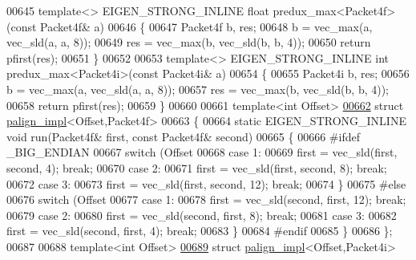 \begin{DoxyCode}
{00645 \textcolor{keyword}{template}<> EIGEN\_STRONG\_INLINE \textcolor{keywordtype}{float} predux\_max<Packet4f>(\textcolor{keyword}{const} Packet4f& a)
00646 \{
00647   Packet4f b, res;
00648   b = vec\_max(a, vec\_sld(a, a, 8));
00649   res = vec\_max(b, vec\_sld(b, b, 4));
00650   \textcolor{keywordflow}{return} pfirst(res);
00651 \}
00652 
00653 \textcolor{keyword}{template}<> EIGEN\_STRONG\_INLINE \textcolor{keywordtype}{int} predux\_max<Packet4i>(\textcolor{keyword}{const} Packet4i& a)
00654 \{
00655   Packet4i b, res;
00656   b = vec\_max(a, vec\_sld(a, a, 8));
00657   res = vec\_max(b, vec\_sld(b, b, 4));
00658   \textcolor{keywordflow}{return} pfirst(res);
00659 \}
00660 
00661 \textcolor{keyword}{template}<\textcolor{keywordtype}{int} Offset>
\hyperlink{struct_eigen_1_1internal_1_1palign__impl_3_01_offset_00_01_packet4f_01_4}{00662} \textcolor{keyword}{struct }\hyperlink{struct_eigen_1_1internal_1_1palign__impl}{palign\_impl}<Offset,Packet4f>
00663 \{
00664   \textcolor{keyword}{static} EIGEN\_STRONG\_INLINE \textcolor{keywordtype}{void} run(Packet4f& first, \textcolor{keyword}{const} Packet4f& second)
00665   \{
00666 \textcolor{preprocessor}{#ifdef \_BIG\_ENDIAN}
00667     \textcolor{keywordflow}{switch} (Offset %
00668     \textcolor{keywordflow}{case} 1:
00669       first = vec\_sld(first, second, 4); \textcolor{keywordflow}{break};
00670     \textcolor{keywordflow}{case} 2:
00671       first = vec\_sld(first, second, 8); \textcolor{keywordflow}{break};
00672     \textcolor{keywordflow}{case} 3:
00673       first = vec\_sld(first, second, 12); \textcolor{keywordflow}{break};
00674     \}
00675 \textcolor{preprocessor}{#else}
00676     \textcolor{keywordflow}{switch} (Offset %
00677     \textcolor{keywordflow}{case} 1:
00678       first = vec\_sld(second, first, 12); \textcolor{keywordflow}{break};
00679     \textcolor{keywordflow}{case} 2:
00680       first = vec\_sld(second, first, 8); \textcolor{keywordflow}{break};
00681     \textcolor{keywordflow}{case} 3:
00682       first = vec\_sld(second, first, 4); \textcolor{keywordflow}{break};
00683     \}
00684 \textcolor{preprocessor}{#endif}
00685   \}
00686 \};
00687 
00688 \textcolor{keyword}{template}<\textcolor{keywordtype}{int} Offset>
\hyperlink{struct_eigen_1_1internal_1_1palign__impl_3_01_offset_00_01_packet4i_01_4}{00689} \textcolor{keyword}{struct }\hyperlink{struct_eigen_1_1internal_1_1palign__impl}{palign\_impl}<Offset,Packet4i>
}
\end{DoxyCode}
